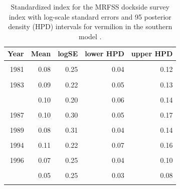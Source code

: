 \documentclass[
  english,
  a4paper,
]{article}
\begin{document}
\begin{table}

\caption{\label{tab:tab-index-mrfss}Standardized index for the MRFSS dockside survey index with log-scale standard errors and 95%
       posterior density (HPD) intervals for vermilion in the southern model .}
\centering
\begin{tabular}[t]{rrrrr}
\toprule
Year & Mean & logSE & lower HPD & upper HPD\\
\midrule
\cellcolor{gray!6}{1980} & \cellcolor{gray!6}{0.03} & \cellcolor{gray!6}{0.30} & \cellcolor{gray!6}{0.02} & \cellcolor{gray!6}{0.05}\\
1981 & 0.08 & 0.25 & 0.04 & 0.12\\
\cellcolor{gray!6}{1982} & \cellcolor{gray!6}{0.06} & \cellcolor{gray!6}{0.25} & \cellcolor{gray!6}{0.03} & \cellcolor{gray!6}{0.09}\\
1983 & 0.09 & 0.22 & 0.05 & 0.13\\
\cellcolor{gray!6}{1984} & \cellcolor{gray!6}{0.12} & \cellcolor{gray!6}{0.17} & \cellcolor{gray!6}{0.08} & \cellcolor{gray!6}{0.16}\\
\addlinespace
1985 & 0.10 & 0.20 & 0.06 & 0.14\\
\cellcolor{gray!6}{1986} & \cellcolor{gray!6}{0.18} & \cellcolor{gray!6}{0.18} & \cellcolor{gray!6}{0.13} & \cellcolor{gray!6}{0.26}\\
1987 & 0.10 & 0.30 & 0.05 & 0.17\\
\cellcolor{gray!6}{1988} & \cellcolor{gray!6}{0.16} & \cellcolor{gray!6}{0.22} & \cellcolor{gray!6}{0.10} & \cellcolor{gray!6}{0.25}\\
1989 & 0.08 & 0.31 & 0.04 & 0.14\\
\addlinespace
\cellcolor{gray!6}{1993} & \cellcolor{gray!6}{0.06} & \cellcolor{gray!6}{0.28} & \cellcolor{gray!6}{0.03} & \cellcolor{gray!6}{0.10}\\
1994 & 0.11 & 0.22 & 0.07 & 0.16\\
\cellcolor{gray!6}{1995} & \cellcolor{gray!6}{0.04} & \cellcolor{gray!6}{0.42} & \cellcolor{gray!6}{0.02} & \cellcolor{gray!6}{0.09}\\
1996 & 0.07 & 0.25 & 0.04 & 0.10\\
\cellcolor{gray!6}{1997} & \cellcolor{gray!6}{0.04} & \cellcolor{gray!6}{0.46} & \cellcolor{gray!6}{0.02} & \cellcolor{gray!6}{0.09}\\
\addlinespace
1998 & 0.05 & 0.25 & 0.03 & 0.08\\
\cellcolor{gray!6}{1999} & \cellcolor{gray!6}{0.15} & \cellcolor{gray!6}{0.17} & \cellcolor{gray!6}{0.10} & \cellcolor{gray!6}{0.21}\\
\bottomrule
\end{tabular}
\end{table}
\end{document}
